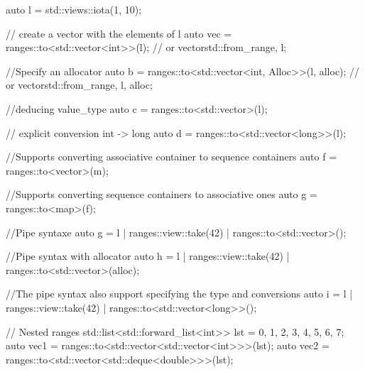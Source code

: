 \documentclass{wg21}
\begin{document}
\begin{colorblock}
auto l = std::views::iota(1, 10);

// create a vector with the elements of l
auto vec = ranges::to<std::vector<int>>(l); // or vector{std::from_range, l};

//Specify an allocator
auto b = ranges::to<std::vector<int, Alloc>>(l, alloc); // or vector{std::from_range, l, alloc};

//deducing value_type
auto c = ranges::to<std::vector>(l);

// explicit conversion int -> long
auto d = ranges::to<std::vector<long>>(l);


//Supports converting associative container to sequence containers
auto f = ranges::to<vector>(m);

//Supports converting sequence containers to associative ones
auto g = ranges::to<map>(f);

//Pipe syntaxe
auto g = l | ranges::view::take(42) | ranges::to<std::vector>();

//Pipe syntax with allocator
auto h = l | ranges::view::take(42) | ranges::to<std::vector>(alloc);

//The pipe syntax also support specifying the type and conversions
auto i = l | ranges::view::take(42) | ranges::to<std::vector<long>>();

// Nested ranges
std::list<std::forward_list<int>> lst = {{0, 1, 2, 3}, {4, 5, 6, 7}};
auto vec1 = ranges::to<std::vector<std::vector<int>>>(lst);
auto vec2 = ranges::to<std::vector<std::deque<double>>>(lst);

\end{colorblock}
\end{document}

